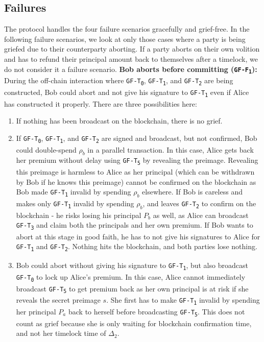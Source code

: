 \subsection{Failures}
The protocol handles the four failure scenarios gracefully and grief-free. In the following failure scenarios, we look at only those cases where a party is being griefed due to their counterparty aborting. If a party aborts on their own volition and has to refund their principal amount back to themselves after a timelock, we do not consider it a failure scenario. 
\bigbreak
\noindent
\textbf{Bob aborts before committing (\texttt{GF-F\textsubscript{1}}):}
During the off-chain interaction where \texttt{GF-T\textsubscript{0}}, \texttt{GF-T\textsubscript{1}}, and \texttt{GF-T\textsubscript{2}} are being constructed, Bob could abort and not give his signature to \texttt{GF-T\textsubscript{1}} even if Alice has constructed it properly. There are three possibilities here: 
\begin{enumerate}
    \item If nothing has been broadcast on the blockchain, there is no grief. 
    \item If \texttt{GF-T\textsubscript{0}}, \texttt{GF-T\textsubscript{1}}, and \texttt{GF-T\textsubscript{2}} are signed and broadcast, but not confirmed, Bob could double-spend $\rho_b$ in a parallel transaction. In this case, Alice gets back her premium without delay using \texttt{GF-T\textsubscript{5}} by revealing the preimage. Revealing this preimage is harmless to Alice as her principal (which can be withdrawn by Bob if he knows this preimage) cannot be confirmed on the blockchain as Bob made \texttt{GF-T\textsubscript{1}} invalid by spending $\rho_b$ elsewhere. If Bob is careless and makes only \texttt{GF-T\textsubscript{1}} invalid by spending $\rho_b$, and leaves \texttt{GF-T\textsubscript{2}} to confirm on the blockchain - he risks losing his principal $P_b$ as well, as Alice can broadcast \texttt{GF-T\textsubscript{3}} and claim both the principals and her own premium. If Bob wants to abort at this stage in good faith, he has to not give his signatures to Alice for \texttt{GF-T\textsubscript{1}} and \texttt{GF-T\textsubscript{2}}. Nothing hits the blockchain, and both parties lose nothing.
    \item Bob could abort without giving his signature to \texttt{GF-T\textsubscript{1}}, but also broadcast \texttt{GF-T\textsubscript{0}} to lock up Alice's premium. In this case, Alice cannot immediately broadcast \texttt{GF-T\textsubscript{5}} to get premium back as her own principal is at risk if she reveals the secret preimage $s$. She first has to make \texttt{GF-T\textsubscript{1}} invalid by spending her principal $P_a$ back to herself before broadcasting \texttt{GF-T\textsubscript{5}}. This does not count as grief because she is only waiting for blockchain confirmation time, and not her timelock time of $\Delta_2$.
\end{enumerate}
